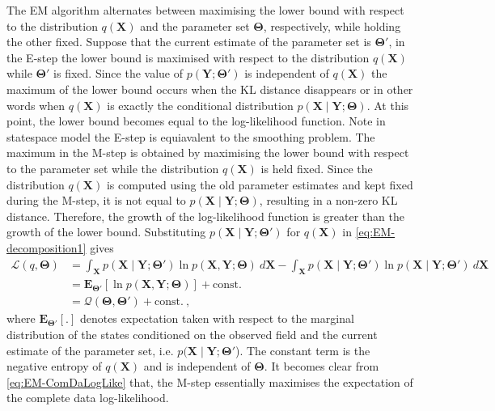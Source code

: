 \documentclass[11pt,draftcls,onecolumn,peerreview]{IEEEtran}
\begin{document}
The EM algorithm alternates between maximising the lower bound with respect to the distribution $q(\mathbf X)$ and the parameter set $\boldsymbol\Theta$, respectively, while holding the other fixed. Suppose that the current estimate of the parameter set is $\boldsymbol\Theta'$, in the E-step the lower bound is maximised with respect to the distribution $q(\mathbf X)$ while $\boldsymbol\Theta'$ is fixed. Since the value of $p(\mathbf Y;\boldsymbol\Theta')$ is independent of $q(\mathbf X)$ the maximum of the lower bound occurs when the KL distance disappears or in other words when $q(\mathbf X)$ is exactly the conditional distribution $p(\mathbf X \mid \mathbf Y;\boldsymbol\Theta)$. At this point, the lower bound becomes equal to the log-likelihood function. Note in statespace model the E-step is equiavalent to the smoothing problem. The maximum in the M-step is obtained by maximising the lower bound with respect to the parameter set while the distribution $q(\mathbf X)$ is held fixed. Since the distribution $q(\mathbf X)$ is computed using the old parameter estimates and kept fixed during the M-step, it is not equal to $p(\mathbf X \mid \mathbf Y;\boldsymbol\Theta)$, resulting in a non-zero KL distance. Therefore, the growth of the log-likelihood function is greater than the growth of the lower bound. Substituting $p(\mathbf X \mid \mathbf Y;\boldsymbol\Theta')$ for $q(\mathbf X)$ in \eqref{eq:EM-decomposition1} gives
\begin{align}
 \mathcal{L}(q,\boldsymbol\Theta)&=\int_{\mathbf X} p(\mathbf X\mid\mathbf Y;\boldsymbol\Theta')\ln p(\mathbf X,\mathbf Y;\boldsymbol\Theta)~d\mathbf X-\int_{\mathbf X} p(\mathbf X\mid\mathbf Y;\boldsymbol\Theta')\ln p(\mathbf X\mid\mathbf Y;\boldsymbol\Theta')~d\mathbf X \nonumber \\
&= \mathbf E_{\boldsymbol\Theta'}\left[ \ln p(\mathbf X,\mathbf Y;\boldsymbol\Theta)\right] +\mathrm{const.}\nonumber\\
&=\mathcal{Q}(\boldsymbol\Theta,\boldsymbol\Theta')+\mathrm{const.}~,\label{eq:EM-ComDaLogLike}
\end{align}
where $ \mathbf E_{\boldsymbol \Theta'}\left[ .\right] $ denotes expectation taken with respect to the marginal distribution of the states conditioned on the observed field and the current estimate of the parameter set, i.e.  $p(\mathbf X\mid\mathbf Y;\boldsymbol \Theta'$). The constant term is the negative entropy of $q(\mathbf X)$ and is independent of $\boldsymbol\Theta$.   It becomes clear from \eqref{eq:EM-ComDaLogLike} that, the M-step essentially maximises the expectation of the complete data log-likelihood.                                                                        




\ifCLASSOPTIONcaptionsoff
  \newpage
\fi

%  
% 


 
\end{document}
